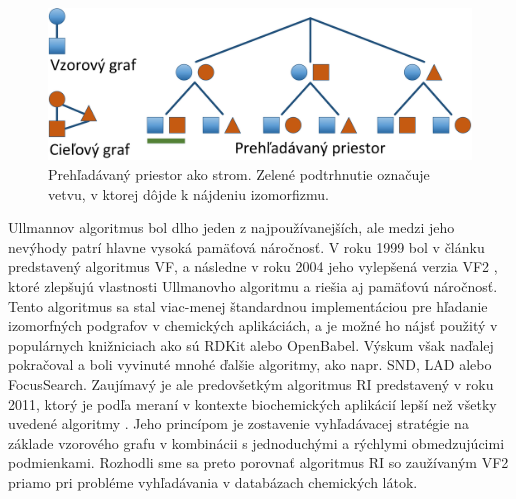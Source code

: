 \documentclass[slovak]{ExcelAtFIT} %
\begin{document}
\begin{figure}[!htb]
	\centering
	\includegraphics[width=1\linewidth]{images/ss_search_tree.pdf}
	\caption{Prehľadávaný priestor ako strom. Zelené podtrhnutie označuje vetvu, v ktorej dôjde k nájdeniu izomorfizmu. \cite{ri}}
	\label{fig:search_space_tree}
\end{figure}

Ullmannov algoritmus bol dlho jeden z naj\-po\-uží\-va\-nej\-ších, ale medzi jeho nevýhody patrí hlavne vysoká pamäťová náročnosť. V roku 1999 bol v článku \cite{vf} predstavený algoritmus VF, a následne v roku 2004 jeho vylepšená verzia VF2 \cite{vf2}, ktoré zlepšujú vlastnosti Ullmanovho algoritmu a riešia aj pamäťovú náročnosť. Tento algoritmus sa stal viac-menej štan\-dard\-nou implementáciou pre hľadanie izomorfných podgrafov v chemických aplikáciách, a je možné ho nájsť použitý v populárnych knižniciach ako sú RDKit alebo OpenBabel. Výskum však naďalej pokračoval a boli vyvinuté mnohé ďalšie algoritmy, ako napr. SND, LAD alebo FocusSearch. Zaujímavý je ale predovšetkým algoritmus RI predstavený v roku 2011, ktorý je podľa meraní v kontexte biochemických aplikácií lepší než všetky uvedené algoritmy \cite{ri}. Jeho princípom je zostavenie vyhľadávacej stratégie na zá\-kla\-de vzorového grafu v kombinácii s jednoduchými a rýchlymi obmedzujúcimi podmienkami. Rozhodli sme sa preto porovnať algoritmus RI so zaužívaným VF2 priamo pri probléme vyhľadávania v databázach chemických látok.
\end{document}
